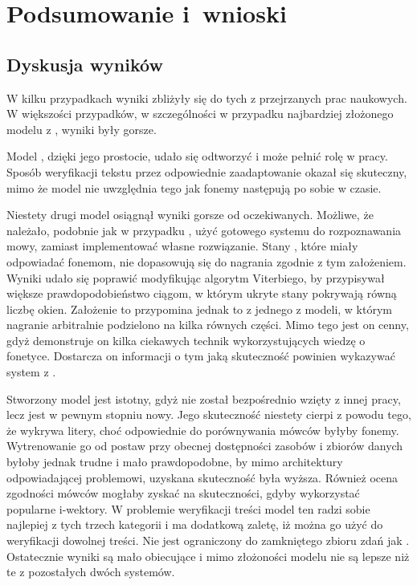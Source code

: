 \chapter{Podsumowanie i~wnioski}\label{chap:podsumowanie}

\section{Dyskusja wyników}

W kilku przypadkach wyniki zbliżyły się do tych z przejrzanych prac naukowych. W większości przypadków,
w szczególności w przypadku najbardziej złożonego modelu z , wyniki były gorsze.

Model , dzięki jego prostocie, udało się odtworzyć i może pełnić
rolę  w pracy. Sposób weryfikacji tekstu przez odpowiednie zaadaptowanie 
okazał się skuteczny, mimo że model nie uwzględnia tego jak fonemy następują po sobie w czasie.

Niestety drugi model  osiągnął wyniki gorsze od oczekiwanych.
Możliwe, że należało, podobnie jak w przypadku , użyć gotowego systemu do rozpoznawania mowy,
zamiast implementować własne rozwiązanie.
Stany , które miały odpowiadać fonemom, nie dopasowują się do nagrania zgodnie z tym założeniem.
Wyniki udało się poprawić modyfikując algorytm Viterbiego, by przypisywał większe prawdopodobieństwo
ciągom, w którym ukryte stany pokrywają równą liczbę okien. Założenie to przypomina jednak to z jednego
z modeli, w którym nagranie arbitralnie podzielono na kilka równych części. Mimo tego jest on cenny,
gdyż demonstruje on kilka ciekawych technik wykorzystujących wiedzę o fonetyce. Dostarcza on informacji
o tym jaką skuteczność powinien wykazywać system z .

Stworzony model  jest istotny, gdyż nie został bezpośrednio wzięty z innej pracy,
lecz jest w pewnym stopniu nowy. Jego skuteczność niestety cierpi z powodu tego, że 
wykrywa litery, choć odpowiednie do porównywania mówców byłyby fonemy. Wytrenowanie go od postaw przy
obecnej dostępności zasobów i zbiorów danych byłoby jednak trudne i mało prawdopodobne, by mimo
architektury odpowiadającej problemowi, uzyskana skuteczność była wyższa.
Również ocena zgodności mówców mogłaby zyskać na skuteczności, gdyby wykorzystać popularne i-wektory.
W problemie weryfikacji treści model ten radzi sobie najlepiej z tych trzech kategorii i ma
dodatkową zaletę, iż można go użyć do weryfikacji dowolnej treści. Nie jest ograniczony do
zamkniętego zbioru zdań jak . Ostatecznie wyniki są mało obiecujące
i mimo złożoności modelu nie są lepsze niż te z pozostałych dwóch systemów.

